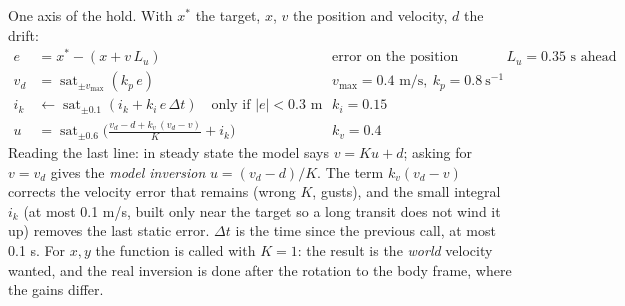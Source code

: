 One axis of the hold. With $x^\ast$ the target, $x$, $v$ the position and velocity, $d$ the drift:
\begin{align*}
e &= x^\ast - (x + v\,L_u) && \text{error on the position predicted } L_u = 0.35\text{ s ahead}\\
v_d &= \operatorname{sat}_{\pm v_{\max}}(k_p\,e) && v_{\max}=0.4\text{ m/s},\ k_p = 0.8\ \text{s}^{-1}\\
i_k &\leftarrow \operatorname{sat}_{\pm0.1}(i_k + k_i\,e\,\Delta t)\quad\text{only if } |e|<0.3\text{ m} && k_i = 0.15\\
u &= \operatorname{sat}_{\pm0.6}\Big(\frac{v_d - d + k_v\,(v_d - v)}{K} + i_k\Big) && k_v = 0.4
\end{align*}
Reading the last line: in steady state the model says $v = K u + d$; asking for $v = v_d$ gives the
\emph{model inversion} $u=(v_d-d)/K$. The term $k_v(v_d-v)$ corrects the velocity error that remains (wrong $K$,
gusts), and the small integral $i_k$ (at most 0.1 m/s, built only near the target so a long transit does not wind
it up) removes the last static error. $\Delta t$ is the time since the previous call, at most 0.1 s. For $x,y$ the
function is called with $K=1$: the result is the \emph{world} velocity wanted, and the real inversion is done after
the rotation to the body frame, where the gains differ.

